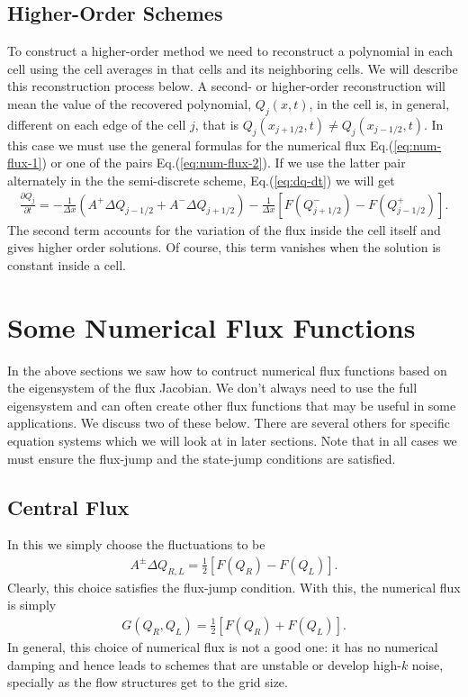 \documentclass[12pt]{article}
\theoremstyle{definition}
\theoremstyle{definition}
\theoremstyle{definition}
\newcommand{\eqr}[1]{Eq.\thinspace(#1)}
\newcommand{\pfrac}[2]{\frac{\partial #1}{\partial #2}}
\begin{document}
\subsection{Higher-Order Schemes}

To construct a higher-order method we need to reconstruct a polynomial
in each cell using the cell averages in that cells and its neighboring
cells. We will describe this reconstruction process below. A second-
or higher-order reconstruction will mean the value of the recovered
polynomial, $Q_j(x,t)$, in the cell is, in general, different on each
edge of the cell $j$, that is $Q_j(x_{j+1/2},t) \ne
Q_j(x_{j-1/2},t)$. In this case we must use the general formulas for
the numerical flux \eqr{\ref{eq:num-flux-1}} or one of the pairs
\eqr{\ref{eq:num-flux-2}}. If we use the latter pair alternately in
the the semi-discrete scheme, \eqr{\ref{eq:dq-dt}} we will get
\begin{align}
  \pfrac{Q_j}{t}
  = 
  -\frac{1}{\Delta x}\left( A^+\Delta Q_{j-1/2} + A^-\Delta Q_{j+1/2} \right)
  -\frac{1}{\Delta x}\left[ F(Q_{j+1/2}^-) - F(Q_{j-1/2}^+)  \right].
  \label{eq:second-order}
\end{align}
The second term accounts for the variation of the flux inside the cell
itself and gives higher order solutions. Of course, this term vanishes
when the solution is constant inside a cell.

\section{Some Numerical Flux Functions}

In the above sections we saw how to contruct numerical flux functions
based on the eigensystem of the flux Jacobian. We don't always need to
use the full eigensystem and can often create other flux functions
that may be useful in some applications. We discuss two of these
below. There are several others for specific equation systems which we
will look at in later sections. Note that in all cases we must ensure
the flux-jump and the state-jump conditions are satisfied.

\subsection{Central Flux}

In this we simply choose the fluctuations to be
\begin{align}
  A^{\pm} \Delta Q_{R,L} = \frac{1}{2} \left[ F(Q_R) - F(Q_L) \right].
\end{align}
Clearly, this choice satisfies the flux-jump condition. With this, the
numerical flux is simply
\begin{align}
  G(Q_R, Q_L) = \frac{1}{2} \left[ F(Q_R) + F(Q_L) \right].
\end{align}
In general, this choice of numerical flux is not a good one: it has no
numerical damping and hence leads to schemes that are unstable or
develop high-$k$ noise, specially as the flow structures get to the
grid size.
\end{document}
